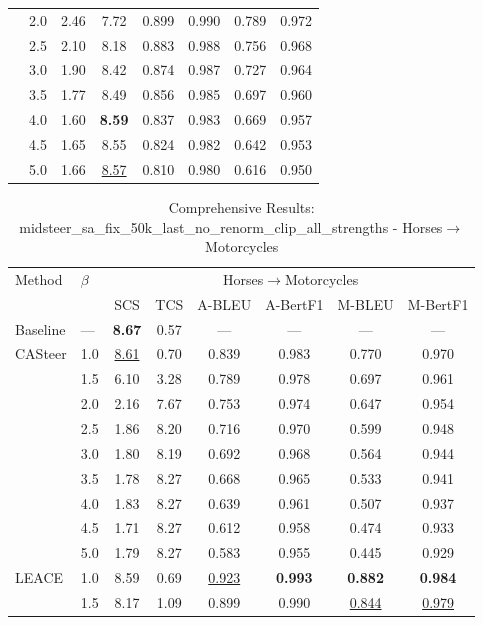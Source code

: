 \begin{table}[htbp]
\begin{tabular}{l|l|cccccc|}
 & 2.0 & 2.46 & 7.72 & 0.899 & 0.990 & 0.789 & 0.972 \\
 & 2.5 & 2.10 & 8.18 & 0.883 & 0.988 & 0.756 & 0.968 \\
 & 3.0 & 1.90 & 8.42 & 0.874 & 0.987 & 0.727 & 0.964 \\
 & 3.5 & 1.77 & 8.49 & 0.856 & 0.985 & 0.697 & 0.960 \\
 & 4.0 & 1.60 & \textbf{8.59} & 0.837 & 0.983 & 0.669 & 0.957 \\
 & 4.5 & 1.65 & 8.55 & 0.824 & 0.982 & 0.642 & 0.953 \\
 & 5.0 & 1.66 & \underline{8.57} & 0.810 & 0.980 & 0.616 & 0.950 \\
\hline
\end{tabular}
\end{table}

\begin{table}[htbp]
\centering
\caption{Comprehensive Results: midsteer\_sa\_fix\_50k\_last\_no\_renorm\_clip\_all\_strengths - Horses$\to$Motorcycles}
\label{tab:single_experiment_table_with_clipping_horses_to_motorcycles}
\begin{tabular}{l|l|cccccc|}
\hline
Method & $\beta$ & \multicolumn{6}{c|}{Horses$\rightarrow$Motorcycles} \\
 &  & SCS & TCS & A-BLEU & A-BertF1 & M-BLEU & M-BertF1 \\
\hline
Baseline & — & \textbf{8.67} & 0.57 & — & — & — & — \\
\hline
CASteer & 1.0 & \underline{8.61} & 0.70 & 0.839 & 0.983 & 0.770 & 0.970 \\
 & 1.5 & 6.10 & 3.28 & 0.789 & 0.978 & 0.697 & 0.961 \\
 & 2.0 & 2.16 & 7.67 & 0.753 & 0.974 & 0.647 & 0.954 \\
 & 2.5 & 1.86 & 8.20 & 0.716 & 0.970 & 0.599 & 0.948 \\
 & 3.0 & 1.80 & 8.19 & 0.692 & 0.968 & 0.564 & 0.944 \\
 & 3.5 & 1.78 & 8.27 & 0.668 & 0.965 & 0.533 & 0.941 \\
 & 4.0 & 1.83 & 8.27 & 0.639 & 0.961 & 0.507 & 0.937 \\
 & 4.5 & 1.71 & 8.27 & 0.612 & 0.958 & 0.474 & 0.933 \\
 & 5.0 & 1.79 & 8.27 & 0.583 & 0.955 & 0.445 & 0.929 \\
\hline
LEACE & 1.0 & 8.59 & 0.69 & \underline{0.923} & \textbf{0.993} & \textbf{0.882} & \textbf{0.984} \\
 & 1.5 & 8.17 & 1.09 & 0.899 & 0.990 & \underline{0.844} & \underline{0.979} \\

\end{tabular}
\end{table}
